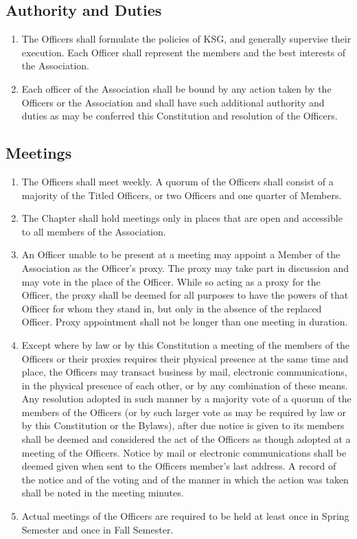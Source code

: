 \documentclass[12pt,letterpaper]{article}
\begin{document}
\subsection{Authority and Duties}
\begin{enumerate}
  \item The Officers shall formulate the policies of KSG, and generally supervise
        their execution. Each Officer shall represent the members and the best
        interests of the Association.
  \item Each officer of the Association shall be bound by any action taken by the
        Officers or the Association and shall have such additional authority and
        duties as may be conferred this Constitution and resolution of the Officers.
\end{enumerate}

\subsection{Meetings}
\begin{enumerate}
  \item The Officers shall meet weekly. A quorum of the Officers shall consist of a
        majority of the Titled Officers, or two Officers and one quarter of Members.
  \item The Chapter shall hold meetings only in places that are open and accessible
        to all members of the Association.
  \item An Officer unable to be present at a meeting may appoint a Member of the
        Association as the Officer's proxy. The proxy may take part in discussion and
        may vote in the place of the Officer. While so acting as a proxy for the
        Officer, the proxy shall be deemed for all purposes to have the powers of
        that Officer for whom they stand in, but only in the absence of the replaced
        Officer. Proxy appointment shall not be longer than one meeting in duration.
  \item Except where by law or by this Constitution a meeting of the members of the
        Officers or their proxies requires their physical presence at the same time
        and place, the Officers may transact business by mail, electronic
        communications, in the physical presence of each other, or by any combination
        of these means. Any resolution adopted in such manner by a majority vote of a
        quorum of the members of the Officers (or by such larger vote as may be
        required by law or by this Constitution or the Bylaws), after due notice is
        given to its members shall be deemed and considered the act of the Officers
        as though adopted at a meeting of the Officers. Notice by mail or electronic
        communications shall be deemed given when sent to the Officers member's last
        address. A record of the notice and of the voting and of the manner in which
        the action was taken shall be noted in the meeting minutes.
  \item Actual meetings of the Officers are required to be held at least once in
        Spring Semester and once in Fall Semester.
\end{enumerate}
\end{document}
